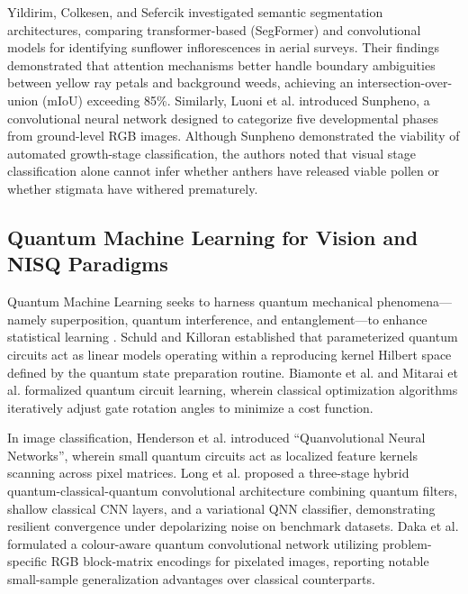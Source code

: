 \documentclass{ieeeaccess}
\begin{document}
Yildirim, Colkesen, and Sefercik \cite{yildirim2026evaluating} investigated semantic segmentation architectures, comparing transformer-based (SegFormer) and convolutional models for identifying sunflower inflorescences in aerial surveys. Their findings demonstrated that attention mechanisms better handle boundary ambiguities between yellow ray petals and background weeds, achieving an intersection-over-union (mIoU) exceeding 85\%. Similarly, Luoni et al. \cite{luoni2024sunpheno} introduced Sunpheno, a convolutional neural network designed to categorize five developmental phases from ground-level RGB images. Although Sunpheno demonstrated the viability of automated growth-stage classification, the authors noted that visual stage classification alone cannot infer whether anthers have released viable pollen or whether stigmata have withered prematurely.

\subsection{Quantum Machine Learning for Vision and NISQ Paradigms}
Quantum Machine Learning seeks to harness quantum mechanical phenomena---namely superposition, quantum interference, and entanglement---to enhance statistical learning \cite{biamonte2017quantum, schuld2019quantum}. Schuld and Killoran \cite{schuld2019quantum} established that parameterized quantum circuits act as linear models operating within a reproducing kernel Hilbert space defined by the quantum state preparation routine. Biamonte et al. \cite{biamonte2017quantum} and Mitarai et al. \cite{mitarai2018quantum} formalized quantum circuit learning, wherein classical optimization algorithms iteratively adjust gate rotation angles to minimize a cost function.

In image classification, Henderson et al. \cite{henderson2020quanvolutional} introduced ``Quanvolutional Neural Networks'', wherein small quantum circuits act as localized feature kernels scanning across pixel matrices. Long et al. \cite{long2025hybrid} proposed a three-stage hybrid quantum-classical-quantum convolutional architecture combining quantum filters, shallow classical CNN layers, and a variational QNN classifier, demonstrating resilient convergence under depolarizing noise on benchmark datasets. Daka et al. \cite{daka2026novel} formulated a colour-aware quantum convolutional network utilizing problem-specific RGB block-matrix encodings for pixelated images, reporting notable small-sample generalization advantages over classical counterparts.
\end{document}
